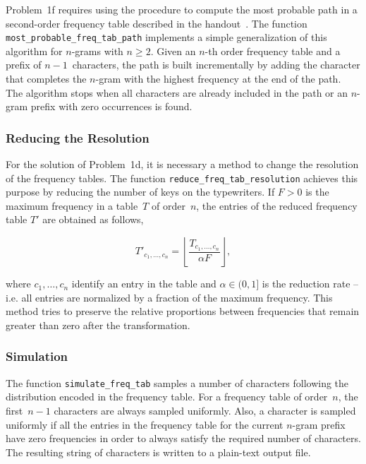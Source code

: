 \documentclass[conference]{IEEEtran}
\newcommand{\codeinline}[1]{{\fontsize{8}{0}\selectfont\texttt{#1}}}
\begin{document}
Problem~1f requires using the procedure to compute the most probable path in a second-order frequency table described in the handout~\cite{Bennett1976}.
The function \codeinline{most\_probable\_freq\_tab\_path} implements a simple generalization of this algorithm for \mbox{\mbox{$n$-gram}s} with $n\geq2$.
Given an $n$-th order frequency table and a prefix of $n-1$~characters, the path is built incrementally by adding the character that completes the \mbox{$n$-gram} with the highest frequency at the end of the path.
The algorithm stops when all characters are already included in the path or an \mbox{$n$-gram} prefix with zero occurrences is found.

\vspace{0.5em}
\subsubsection{Reducing the Resolution}

For the solution of Problem~1d, it is necessary a method to change the resolution of the frequency tables.
The function \codeinline{reduce\_freq\_tab\_resolution} achieves this purpose by reducing the number of keys on the typewriters.
If $F>0$ is the maximum frequency in a table~$T$ of order~$n$, the entries of the reduced frequency table $T'$ are obtained as follows,

$$T'_{c_1,\ldots,c_n} = \left\lfloor\frac{T_{c_1,\ldots,c_n}}{\alpha F}\right\rfloor,$$

\noindent where $c_1,\ldots,c_n$ identify an entry in the table and $\alpha \in (0,1]$ is the reduction rate 
-- i.e. all entries are normalized by a fraction of the maximum frequency.
This method tries to preserve the relative proportions between frequencies that remain greater than zero after the transformation.

\vspace{0.5em}
\subsubsection{Simulation}

The function \codeinline{simulate\_freq\_tab} samples a number of characters following the distribution encoded in the frequency table.
For a frequency table of order~$n$, the first~$n-1$ characters are always sampled uniformly.
Also, a character is sampled uniformly if all the entries in the frequency table for the current \mbox{$n$-gram} prefix have zero frequencies in order to always satisfy the required number of characters.
The resulting string of characters is written to a plain-text output file.
\end{document}
